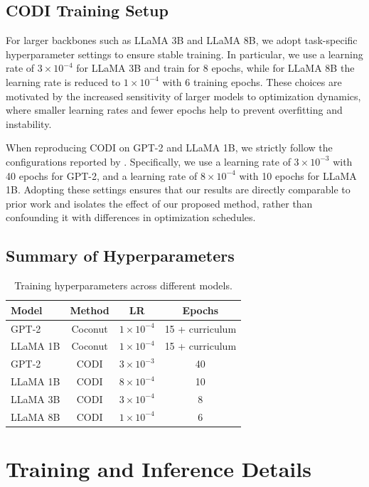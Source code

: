 \subsection{CODI Training Setup}
For larger backbones such as LLaMA 3B and LLaMA 8B, we adopt task-specific hyperparameter settings to ensure stable training. In particular, we use a learning rate of $3 \times 10^{-4}$ for LLaMA 3B and train for 8 epochs, while for LLaMA 8B the learning rate is reduced to $1 \times 10^{-4}$ with 6 training epochs. These choices are motivated by the increased sensitivity of larger models to optimization dynamics, where smaller learning rates and fewer epochs help to prevent overfitting and instability.  

When reproducing CODI on GPT-2 and LLaMA 1B, we strictly follow the configurations reported by \citet{shen2025codi}. Specifically, we use a learning rate of $3 \times 10^{-3}$ with 40 epochs for GPT-2, and a learning rate of $8 \times 10^{-4}$ with 10 epochs for LLaMA 1B. Adopting these settings ensures that our results are directly comparable to prior work and isolates the effect of our proposed method, rather than confounding it with differences in optimization schedules.  


\subsection{Summary of Hyperparameters}
\begin{table}[h!]
\centering
\caption{Training hyperparameters across different models.}
\label{tab:hyperparams}
\begin{tabular}{lccc}
\toprule
\textbf{Model} & \textbf{Method} & \textbf{LR} & \textbf{Epochs} \\
\midrule
GPT-2          & Coconut & $1 \times 10^{-4}$ & 15 + curriculum  \\
LLaMA 1B       & Coconut & $1 \times 10^{-4}$ & 15 + curriculum  \\
GPT-2          & CODI    & $3 \times 10^{-3}$ & 40  \\
LLaMA 1B       & CODI    & $8 \times 10^{-4}$ & 10  \\
LLaMA 3B       & CODI    & $3 \times 10^{-4}$ & 8   \\
LLaMA 8B       & CODI    & $1 \times 10^{-4}$ & 6   \\
\bottomrule
\end{tabular}
\end{table}

\section{Training and Inference Details}
\label{app:train-infer-details}

